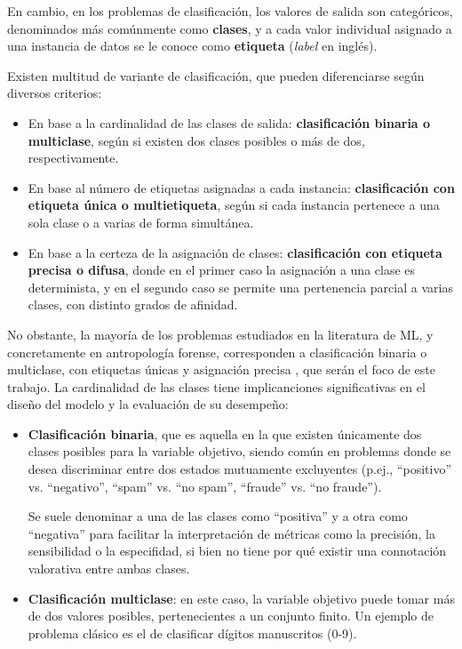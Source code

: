 En cambio, en los problemas de clasificación, los valores de salida son categóricos, denominados más comúnmente como
\textbf{clases}, y a cada valor individual asignado a una instancia de datos se le conoce como \textbf{etiqueta} 
(\textit{label} en inglés).

Existen multitud de variante de clasificación, que pueden diferenciarse según diversos criterios:

\begin{itemize}
    \item En base a la cardinalidad de las clases de salida: \textbf{clasificación binaria o multiclase}, según 
    si existen dos clases posibles o más de dos, respectivamente.

    \item En base al número de etiquetas asignadas a cada instancia: \textbf{clasificación con etiqueta única o 
    multietiqueta}, según si cada instancia pertenece a una sola clase o a varias de forma simultánea.

    \item En base a la certeza de la asignación de clases: \textbf{clasificación con etiqueta precisa o difusa}, 
    donde en el primer caso la asignación a una clase es determinista, y en el segundo caso se permite una 
    pertenencia parcial a varias clases, con distinto grados de afinidad.
    
\end{itemize}

No obstante, la mayoría de los problemas estudiados en la literatura de ML, y concretamente en antropología forense, corresponden a clasificación binaria o 
multiclase, con etiquetas únicas y asignación precisa \cite{bishop2006}, que serán el foco de este trabajo. 
La cardinalidad de las clases tiene implicanciones significativas en el diseño del modelo y la evaluación
de su desempeño:

\begin{itemize}

    \item \textbf{Clasificación binaria}, que es aquella en la que existen únicamente dos clases posibles para la 
    variable objetivo, siendo común en problemas donde se desea discriminar entre dos estados mutuamente 
    excluyentes (p.ej., ``positivo'' vs. ``negativo'', ``spam'' vs. ``no spam'', ``fraude'' vs. ``no fraude'').
    
    Se suele denominar a una de las clases como ``positiva'' y a otra como ``negativa'' para facilitar la 
    interpretación de métricas como la precisión, la sensibilidad o la especifidad, si bien no tiene por qué 
    existir una connotación valorativa entre ambas clases.
    
    \item \textbf{Clasificación multiclase}: en este caso, la variable objetivo puede tomar más de dos valores 
    posibles, pertenecientes a un conjunto finito. Un ejemplo de problema clásico es el de clasificar dígitos
    manuscritos (0-9).

\end{itemize}

